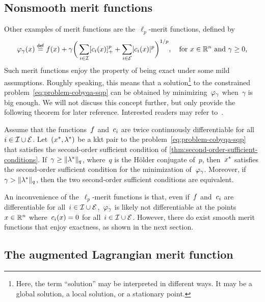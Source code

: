 \subsection{Nonsmooth merit functions}

Other examples of merit functions are the~$\ell_p$-merit functions, defined by
\begin{equation*}
    \merit_{\gamma}(\iter) \eqdef \obj(\iter) + \gamma \bigg( \sum_{i \in \iub} \posp{\con{i}(\iter)}^p + \sum_{i \in \ieq} \abs{\con{i}(\iter)}^p \bigg)^{1/p}, \quad \text{for~$\iter \in \R^n$ and~$\gamma \ge 0$,}
\end{equation*}
Such merit functions enjoy the property of being exact under some mild assumptions.
Roughly speaking, this means that a solution\footnote{Here, the term \enquote{solution} may be interpreted in different ways. It may be a global solution, a local solution, or a stationary point.} to the constrained problem~\cref{eq:problem-cobyqa-sqp} can be obtained by minimizing~$\merit_{\gamma}$ when~$\gamma$ is big enough.
We will not discuss this concept further, but only provide the following theorem for later reference.
Interested readers may refer to~\cite{Han_Mangasarian_1979,Mayne_1980,Pillo_Grippo_1989}.

\begin{theorem}
    \label{thm:exact-merit-function}
    Assume that the functions~$f$ and~$c_{i}$ are twice continuously differentiable for all~$i \in \mathcal{I} \cup \mathcal{E}$.
    Let~$(\iter[\ast], \lm[\ast])$ be a \gls{kkt} pair to the problem~\cref{eq:problem-cobyqa-sqp} that satisfies the second-order sufficient condition of \cref{thm:second-order-sufficient-conditions}.
    If~$\gamma \ge \norm{\lm[\ast]}_q$, where~$q$ is the H{\"{o}}lder conjugate of~$p$, then~$\iter[\ast]$ satisfies the second-order sufficient condition for the minimization of~$\merit_{\gamma}$.
    Moreover, if~$\gamma > \norm{\lm[\ast]}_q$, then the two second-order sufficient conditions are equivalent.
\end{theorem}

An inconvenience of the~$\ell_p$-merit functions is that, even if~$f$ and~$c_{i}$ are differentiable for all~$i \in \mathcal{I} \cup \mathcal{E}$,~$\merit_{\gamma}$ is likely not differentiable at the points~$\iter \in \R^n$ where~$\con{i}(\iter) = 0$ for all~$i \in \mathcal{I} \cup \mathcal{E}$.
However, there do exist smooth merit functions that enjoy exactness, as shown in the next section.

\subsection{The augmented Lagrangian merit function}

